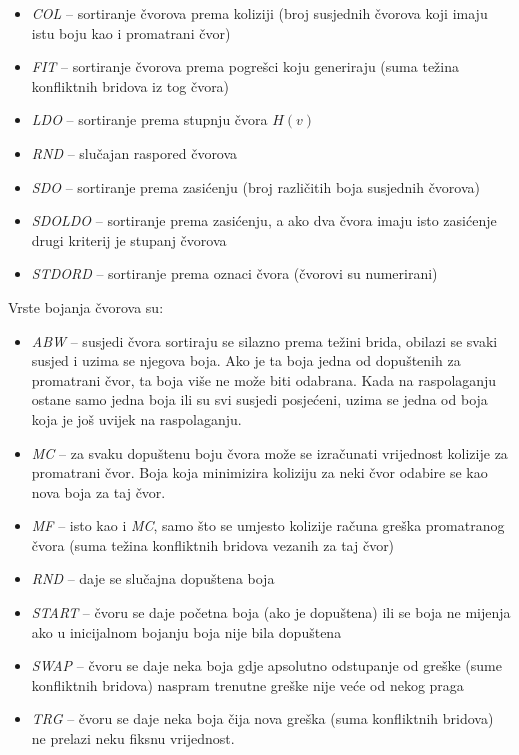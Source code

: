 \documentclass[times, utf8, diplomski, numeric]{fer}
\begin{document}
\begin{itemize}
	\item \emph{COL} -- sortiranje čvorova prema koliziji (broj susjednih čvorova koji imaju istu boju kao i promatrani čvor)
	\item \emph{FIT} -- sortiranje čvorova prema pogrešci koju generiraju (suma težina konfliktnih bridova iz tog čvora)
	\item \emph{LDO} -- sortiranje prema stupnju čvora $H(v)$
	\item \emph{RND} -- slučajan raspored čvorova
	\item \emph{SDO} -- sortiranje prema zasićenju (broj različitih boja susjednih čvorova)
	\item \emph{SDOLDO} -- sortiranje prema zasićenju, a ako dva čvora imaju isto zasićenje drugi kriterij je stupanj čvorova
	\item \emph{STDORD} -- sortiranje prema oznaci čvora (čvorovi su numerirani)
\end{itemize}

Vrste bojanja čvorova su:

\begin{itemize}
	\item \emph{ABW} -- susjedi čvora sortiraju se silazno prema težini brida, obilazi se svaki susjed i uzima se njegova boja. Ako je ta boja jedna od dopuštenih za promatrani čvor, ta boja više ne može biti odabrana. Kada na raspolaganju ostane samo jedna boja ili su svi susjedi posjećeni, uzima se jedna od boja koja je još uvijek na raspolaganju. 
	\item \emph{MC} -- za svaku dopuštenu boju čvora može se izračunati vrijednost kolizije za promatrani čvor. Boja koja minimizira koliziju za neki čvor odabire se kao nova boja za taj čvor.
	\item \emph{MF} -- isto kao i \emph{MC}, samo što se umjesto kolizije računa greška promatranog čvora (suma težina konfliktnih bridova vezanih za taj čvor)
	\item \emph{RND} -- daje se slučajna dopuštena boja
	\item \emph{START} -- čvoru se daje početna boja (ako je dopuštena) ili se boja ne mijenja ako u inicijalnom bojanju boja nije bila dopuštena
	\item \emph{SWAP} -- čvoru se daje neka boja gdje apsolutno odstupanje od greške (sume konfliktnih bridova) naspram trenutne greške nije veće od nekog praga
	\item \emph{TRG} -- čvoru se daje neka boja čija nova greška (suma konfliktnih bridova) ne prelazi neku fiksnu vrijednost. 
\end{itemize}
\end{document}
